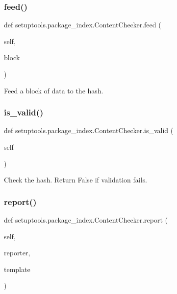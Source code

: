 \subsubsection{\texorpdfstring{feed()}{feed()}}
{\footnotesize\ttfamily def setuptools.\+package\+\_\+index.\+Content\+Checker.\+feed (\begin{DoxyParamCaption}\item[{}]{self,  }\item[{}]{block }\end{DoxyParamCaption})}

\begin{DoxyVerb}Feed a block of data to the hash.
\end{DoxyVerb}
 \mbox{\label{classsetuptools_1_1package__index_1_1_content_checker_a981f111f10e8174e1aa6fdc8f7999f26}} 
\subsubsection{\texorpdfstring{is\+\_\+valid()}{is\_valid()}}
{\footnotesize\ttfamily def setuptools.\+package\+\_\+index.\+Content\+Checker.\+is\+\_\+valid (\begin{DoxyParamCaption}\item[{}]{self }\end{DoxyParamCaption})}

\begin{DoxyVerb}Check the hash. Return False if validation fails.
\end{DoxyVerb}
 \mbox{\label{classsetuptools_1_1package__index_1_1_content_checker_a861a390c4a6f66d304be4a23cbe51964}} 
\subsubsection{\texorpdfstring{report()}{report()}}
{\footnotesize\ttfamily def setuptools.\+package\+\_\+index.\+Content\+Checker.\+report (\begin{DoxyParamCaption}\item[{}]{self,  }\item[{}]{reporter,  }\item[{}]{template }\end{DoxyParamCaption})}

